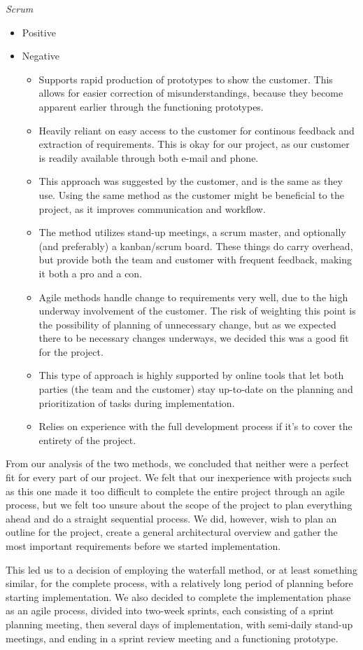 \emph{Scrum}

\begin{itemize}
	\item Positive
	\item Negative
	\begin{itemize}
		\item Supports rapid production of prototypes to show the customer. This allows for easier correction of misunderstandings, because they become apparent earlier through the functioning prototypes.
		\item Heavily reliant on easy access to the customer for continous feedback and extraction of requirements. This is okay for our project, as our customer is readily available through both e-mail and phone.
		\item This approach was suggested by the customer, and is the same as they use. Using the same method as the customer might be beneficial to the project, as it improves communication and workflow.
		\item The method utilizes stand-up meetings, a scrum master, and optionally (and preferably) a kanban/scrum board. These things do carry overhead, but provide both the team and customer with frequent feedback, making it both a pro and a con.
		\item Agile methods handle change to requirements very well, due to the high underway involvement of the customer. The risk of weighting this point is the possibility of planning of unnecessary change, but as we expected there to be necessary changes underways, we decided this was a good fit for the project.
		\item This type of approach is highly supported by online tools that let both parties (the team and the customer) stay up-to-date on the planning and prioritization of tasks during implementation.
		\item Relies on experience with the full development process if it’s to cover the entirety of the project.
	\end{itemize}
\end{itemize}
From our analysis of the two methods, we concluded that neither were a perfect fit for every part of our project. We felt that our inexperience with projects such as this one made it too difficult to complete the entire project through an agile process, but we felt too unsure about the scope of the project to plan everything ahead and do a straight sequential process. We did, however, wish to plan an outline for the project, create a general architectural overview and gather the most important requirements before we started implementation.

This led us to a decision of employing the waterfall method, or at least something similar, for the complete process, with a relatively long period of planning before starting implementation. We also decided to complete the implementation phase as an agile process, divided into two-week sprints, each consisting of a sprint planning meeting, then several days of implementation, with semi-daily stand-up meetings, and ending in a sprint review meeting and a functioning prototype.